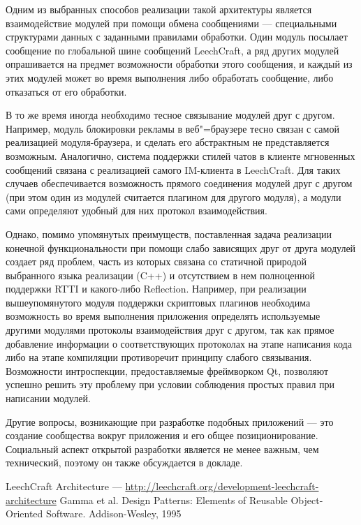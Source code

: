 \documentclass[10pt, a5paper]{article}
\begin{document}
Одним из выбранных способов реализации такой архитектуры является
взаимодействие модулей при помощи обмена сообщениями --- специальными
структурами данных с заданными правилами обработки. Один модуль
посылает сообщение по глобальной шине сообщений LeechCraft, а ряд других
модулей опрашивается на предмет возможности обработки этого сообщения,
и каждый из этих модулей может во время выполнения либо обработать
сообщение, либо отказаться от его обработки.

В то же время иногда необходимо тесное связывание модулей друг с
другом. Например, модуль блокировки рекламы в веб"=браузере тесно
связан с самой реализацией модуля-браузера, и сделать его
абстрактным не представляется возможным. Аналогично, система
поддержки стилей чатов в клиенте мгновенных сообщений связана с
реализацией самого IM-клиента в LeechCraft. Для таких случаев
обеспечивается возможность прямого соединения модулей друг с
другом (при этом один из модулей считается плагином для другого
модуля), а модули сами определяют удобный для них протокол
взаимодействия.

Однако, помимо упомянутых преимуществ, поставленная задача
реализации конечной функциональности при помощи слабо зависящих друг
от друга модулей создает ряд проблем, часть из которых связана со
статичной природой выбранного языка реализации (C++) и отсутствием в
нем полноценной поддержки RTTI и какого-либо Reflection. Например, при
реализации вышеупомянутого модуля поддержки скриптовых плагинов
необходима возможность во время выполнения приложения определять
используемые другими модулями протоколы взаимодействия друг с другом,
так как прямое добавление информации о соответствующих протоколах на
этапе написания кода либо на этапе компиляции противоречит принципу
слабого связывания. Возможности интроспекции, предоставляемые
фреймворком Qt, позволяют успешно решить эту проблему при условии
соблюдения простых правил при написании модулей.

Другие вопросы, возникающие при разработке подобных приложений --- это
создание сообщества вокруг приложения и его общее позиционирование.
Социальный аспект открытой разработки является не менее важным, чем
технический, поэтому он также обсуждается в докладе.

\begin{thebibliography}{9}
	 LeechCraft Architecture --- \url{http://leechcraft.org/development-leechcraft-architecture}
	 Gamma et al. Design Patterns: Elements of Reusable Object-Oriented Software. Addison-Wesley, 1995
\end{thebibliography}
\end{document}
